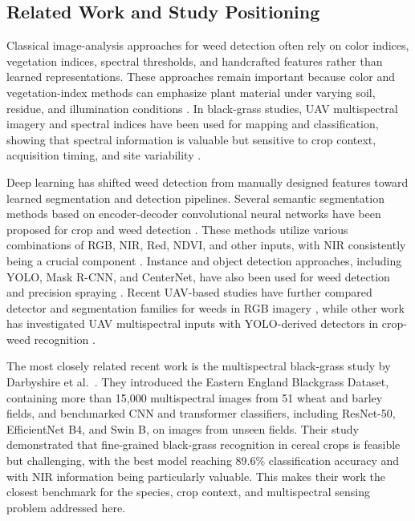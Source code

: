 \documentclass{ieeeaccess}
\begin{document}
\subsection{Related Work and Study Positioning}
Classical image-analysis approaches for weed detection often rely on color indices, vegetation indices, spectral thresholds, and handcrafted features rather than learned representations. These approaches remain important because color and vegetation-index methods can emphasize plant material under varying soil, residue, and illumination conditions \cite{woebbecke1995color, pettorelli2013}. In black-grass studies, UAV multispectral imagery and spectral indices have been used for mapping and classification, showing that spectral information is valuable but sensitive to crop context, acquisition timing, and site variability \cite{lambert_evaluating_2018, lambert_testing_2019, su_spectral_2022, cox_black-grass_2023, goodsell_black_grass_2024}.

Deep learning has shifted weed detection from manually designed features toward learned segmentation and detection pipelines. Several semantic segmentation methods based on encoder-decoder convolutional neural networks have been proposed for crop and weed detection \cite{8379414, 8115245, 9081915, 9963605, 10083238}. These methods utilize various combinations of RGB, NIR, Red, NDVI, and other inputs, with NIR consistently being a crucial component \cite{9081915}. Instance and object detection approaches, including YOLO, Mask R-CNN, and CenterNet, have also been used for weed detection and precision spraying \cite{10075447, 9492056, 9317797, sportelli_evaluation_2023}. Recent UAV-based studies have further compared detector and segmentation families for weeds in RGB imagery \cite{silva_uav_deep_2024, mesias_ruiz_multispecies_2026}, while other work has investigated UAV multispectral inputs with YOLO-derived detectors in crop-weed recognition \cite{tang_cgs_yolo_2025}.

The most closely related recent work is the multispectral black-grass study by Darbyshire et al.~\cite{darbyshire_blackgrass_2025}. They introduced the Eastern England Blackgrass Dataset, containing more than 15,000 multispectral images from 51 wheat and barley fields, and benchmarked CNN and transformer classifiers, including ResNet-50, EfficientNet B4, and Swin B, on images from unseen fields. Their study demonstrated that fine-grained black-grass recognition in cereal crops is feasible but challenging, with the best model reaching 89.6\% classification accuracy and with NIR information being particularly valuable. This makes their work the closest benchmark for the species, crop context, and multispectral sensing problem addressed here.
\end{document}
